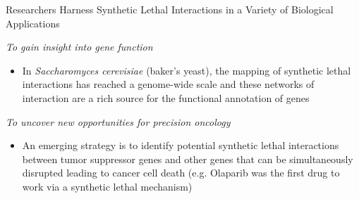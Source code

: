 \documentclass{beamer}
\begin{document}
		
		

	\begin{frame}{Researchers Harness Synthetic Lethal Interactions in a Variety of Biological Applications}
		
		\begin{block}{\textit{To gain insight into gene function}}
			 \begin{itemize}
			 \item In \textit{Saccharomyces cerevisiae} (baker's yeast), the mapping of synthetic lethal interactions has reached a genome-wide scale and these networks of interaction are a rich source for the functional annotation of genes
			 \end{itemize}
		\end{block} \pause
	
		\begin{block}{\textit{To uncover new opportunities for precision oncology}}
			\begin{itemize}
				\item An emerging strategy is to identify potential synthetic lethal interactions between tumor suppressor genes and other genes that can be simultaneously disrupted leading to cancer cell death (e.g. Olaparib was the first drug to work via a synthetic lethal mechanism)
			\end{itemize}
		\end{block} 
	
	
	\end{frame}
\end{document}
